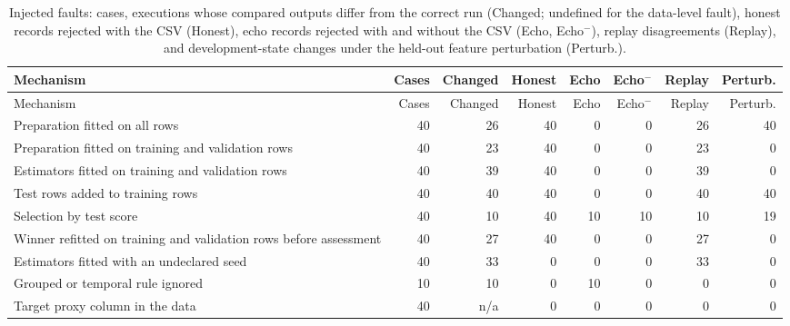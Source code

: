 \documentclass[11pt,letterpaper]{article}
\begin{document}
\begin{longtable}{p{}rrrrrrr}
\caption{Injected faults: cases, executions whose compared outputs differ from the correct run (Changed; undefined for the data-level fault), honest records rejected with the CSV (Honest), echo records rejected with and without the CSV (Echo, Echo$^{-}$), replay disagreements (Replay), and development-state changes under the held-out feature perturbation (Perturb.).}\label{tab:faultfull}\\
\toprule Mechanism & Cases & Changed & Honest & Echo & Echo$^{-}$ & Replay & Perturb.\\\midrule\endfirsthead
\toprule Mechanism & Cases & Changed & Honest & Echo & Echo$^{-}$ & Replay & Perturb.\\\midrule\endhead
Preparation fitted on all rows & 40 & 26 & 40 & 0 & 0 & 26 & 40\\
Preparation fitted on training and validation rows & 40 & 23 & 40 & 0 & 0 & 23 & 0\\
Estimators fitted on training and validation rows & 40 & 39 & 40 & 0 & 0 & 39 & 0\\
Test rows added to training rows & 40 & 40 & 40 & 0 & 0 & 40 & 40\\
Selection by test score & 40 & 10 & 40 & 10 & 10 & 10 & 19\\
Winner refitted on training and validation rows before assessment & 40 & 27 & 40 & 0 & 0 & 27 & 0\\
Estimators fitted with an undeclared seed & 40 & 33 & 0 & 0 & 0 & 33 & 0\\
Grouped or temporal rule ignored & 10 & 10 & 0 & 10 & 0 & 0 & 0\\
Target proxy column in the data & 40 & n/a & 0 & 0 & 0 & 0 & 0\\
\bottomrule
\end{longtable}
\end{document}
